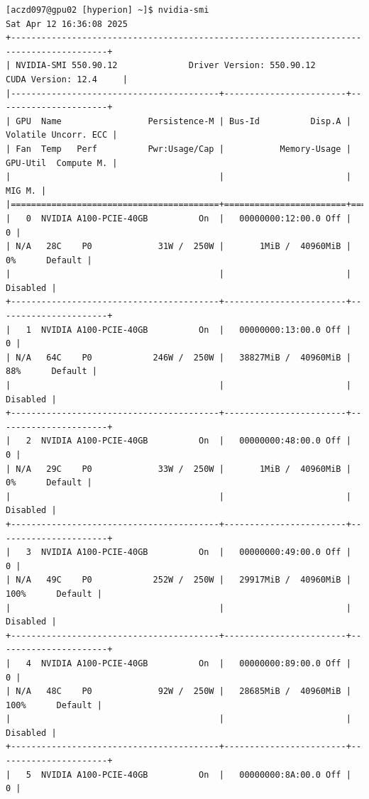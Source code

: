 \begin{verbatim}
[aczd097@gpu02 [hyperion] ~]$ nvidia-smi
Sat Apr 12 16:36:08 2025       
+-----------------------------------------------------------------------------------------+
| NVIDIA-SMI 550.90.12              Driver Version: 550.90.12      CUDA Version: 12.4     |
|-----------------------------------------+------------------------+----------------------+
| GPU  Name                 Persistence-M | Bus-Id          Disp.A | Volatile Uncorr. ECC |
| Fan  Temp   Perf          Pwr:Usage/Cap |           Memory-Usage | GPU-Util  Compute M. |
|                                         |                        |               MIG M. |
|=========================================+========================+======================|
|   0  NVIDIA A100-PCIE-40GB          On  |   00000000:12:00.0 Off |                    0 |
| N/A   28C    P0             31W /  250W |       1MiB /  40960MiB |      0%      Default |
|                                         |                        |             Disabled |
+-----------------------------------------+------------------------+----------------------+
|   1  NVIDIA A100-PCIE-40GB          On  |   00000000:13:00.0 Off |                    0 |
| N/A   64C    P0            246W /  250W |   38827MiB /  40960MiB |     88%      Default |
|                                         |                        |             Disabled |
+-----------------------------------------+------------------------+----------------------+
|   2  NVIDIA A100-PCIE-40GB          On  |   00000000:48:00.0 Off |                    0 |
| N/A   29C    P0             33W /  250W |       1MiB /  40960MiB |      0%      Default |
|                                         |                        |             Disabled |
+-----------------------------------------+------------------------+----------------------+
|   3  NVIDIA A100-PCIE-40GB          On  |   00000000:49:00.0 Off |                    0 |
| N/A   49C    P0            252W /  250W |   29917MiB /  40960MiB |    100%      Default |
|                                         |                        |             Disabled |
+-----------------------------------------+------------------------+----------------------+
|   4  NVIDIA A100-PCIE-40GB          On  |   00000000:89:00.0 Off |                    0 |
| N/A   48C    P0             92W /  250W |   28685MiB /  40960MiB |    100%      Default |
|                                         |                        |             Disabled |
+-----------------------------------------+------------------------+----------------------+
|   5  NVIDIA A100-PCIE-40GB          On  |   00000000:8A:00.0 Off |                    0 |

\end{verbatim}
